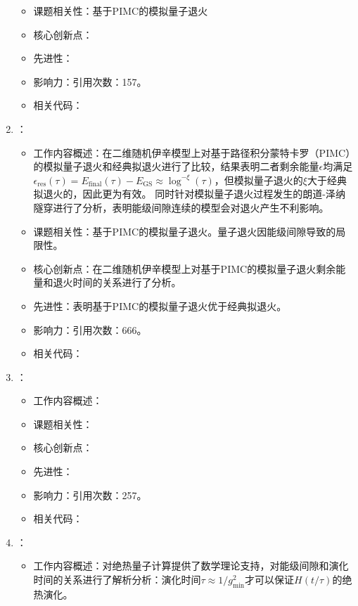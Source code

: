 \begin{enumerate}
\begin{itemize}
                \item 课题相关性：基于PIMC的模拟量子退火
                \item 核心创新点：
                \item 先进性：
                \item 影响力：引用次数：157。
                \item 相关代码：
            \end{itemize}
        \item \citet{santoro2002theory}：
            \begin{itemize}
                \item 工作内容概述：在二维随机伊辛模型上对基于路径积分蒙特卡罗（PIMC）的模拟量子退火和经典拟退火进行了比较，结果表明二者剩余能量$\epsilon$均满足$\epsilon_{\text{res}}(\tau)=E_{\text{final}}(\tau)-E_{\text{GS}}\approx\log^{-\xi}(\tau)$，但模拟量子退火的$\xi$大于经典拟退火的，因此更为有效。
                同时针对模拟量子退火过程发生的朗道-泽纳隧穿进行了分析，表明能级间隙连续的模型会对退火产生不利影响。
                \item 课题相关性：基于PIMC的模拟量子退火。量子退火因能级间隙导致的局限性。
                \item 核心创新点：在二维随机伊辛模型上对基于PIMC的模拟量子退火剩余能量和退火时间的关系进行了分析。
                \item 先进性：表明基于PIMC的模拟量子退火优于经典拟退火。
                \item 影响力：引用次数：666。
                \item 相关代码：
            \end{itemize}
            \item \citet{bravyi2006complexity}：
            \begin{itemize}
                \item 工作内容概述：
                \item 课题相关性：
                \item 核心创新点：
                \item 先进性：
                \item 影响力：引用次数：257。
                \item 相关代码：
            \end{itemize}
            \item \citet{jansen2007bounds}：
            \begin{itemize}
                \item 工作内容概述：对绝热量子计算提供了数学理论支持，对能级间隙和演化时间的关系进行了解析分析：演化时间$\tau\approx 1/g_{\text{min}}^2$才可以保证$H(t/\tau)$的绝热演化。

\end{itemize}
\end{enumerate}
